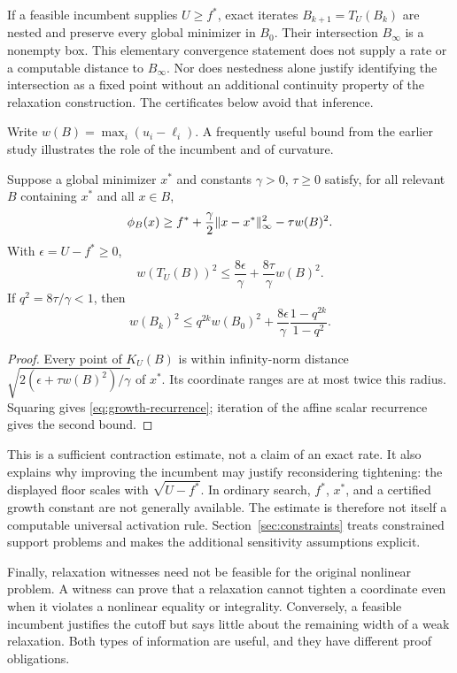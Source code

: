 If a feasible incumbent supplies $U\ge f^*$, exact iterates
$B_{k+1}=T_U(B_k)$ are nested and preserve every global minimizer in
$B_0$. Their intersection $B_\infty$ is a nonempty box. This elementary
convergence statement does not supply a rate or a computable distance to
$B_\infty$. Nor does nestedness alone justify identifying the intersection
as a fixed point without an additional continuity property of the
relaxation construction. The certificates below avoid that inference.

Write $w(B)=\max_i(u_i-\ell_i)$. A frequently useful bound from the
earlier study illustrates the role of the incumbent and of curvature.

\begin{proposition}\label{prop:growth}
Suppose a global minimizer $x^*$ and constants $\gamma>0$, $\tau\ge0$
satisfy, for all relevant $B$ containing $x^*$ and all $x\in B$,
\[
 \phi_B(x)\ge f^*+\frac{\gamma}{2}\lVert x-x^*\rVert_\infty^2-\tau w(B)^2.
\]
With $\epsilon=U-f^*\ge0$,
\begin{equation}\label{eq:growth-recurrence}
 w(T_U(B))^2\le\frac{8\epsilon}{\gamma}
                     +\frac{8\tau}{\gamma}w(B)^2.
\end{equation}
If $q^2=8\tau/\gamma<1$, then
\[
 w(B_k)^2\le q^{2k}w(B_0)^2+
 \frac{8\epsilon}{\gamma}\frac{1-q^{2k}}{1-q^2}.
\]
\end{proposition}
\begin{proof}
Every point of $K_U(B)$ is within infinity-norm distance
$\sqrt{2(\epsilon+\tau w(B)^2)/\gamma}$ of $x^*$.
Its coordinate ranges are at most twice this radius. Squaring gives
\eqref{eq:growth-recurrence}; iteration of the affine scalar recurrence
gives the second bound.
\end{proof}

This is a sufficient contraction estimate, not a claim of an exact rate.
It also explains why improving the incumbent may justify reconsidering
tightening: the displayed floor scales with $\sqrt{U-f^*}$. In ordinary
search, $f^*$, $x^*$, and a certified growth constant are not generally
available. The estimate is therefore not itself a computable universal
activation rule. Section~\ref{sec:constraints} treats constrained support
problems and makes the additional sensitivity assumptions explicit.

Finally, relaxation witnesses need not be feasible for the original
nonlinear problem. A witness can prove that a relaxation cannot tighten a
coordinate even when it violates a nonlinear equality or integrality.
Conversely, a feasible incumbent justifies the cutoff but says little
about the remaining width of a weak relaxation. Both types of information
are useful, and they have different proof obligations.
